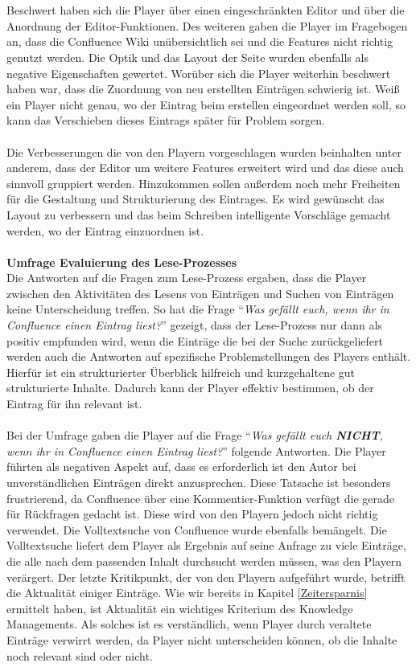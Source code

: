 \documentclass[a4paper,12pt,twoside]{scrartcl}
\begin{document}
\\\\
Beschwert haben sich die Player über einen eingeschränkten Editor und über die Anordnung der Editor-Funktionen. Des weiteren gaben die Player im Fragebogen an, dass die Confluence Wiki unübersichtlich sei und die Features nicht richtig genutzt werden. Die Optik und das Layout der Seite wurden ebenfalls als negative Eigenschaften gewertet. Worüber sich die Player weiterhin beschwert haben war, dass die Zuordnung von neu erstellten Einträgen schwierig ist. Weiß ein Player nicht genau, wo der Eintrag beim erstellen eingeordnet werden soll, so kann das Verschieben dieses Eintrags später für Problem sorgen.
\\\\
Die Verbesserungen die von den Playern vorgeschlagen wurden beinhalten unter anderem, dass der Editor um weitere Features erweitert wird und das diese auch sinnvoll gruppiert werden. Hinzukommen sollen außerdem noch mehr Freiheiten für die Gestaltung und Strukturierung des Eintrages. Es wird gewünscht das Layout zu verbessern und das beim Schreiben intelligente Vorschläge gemacht werden, wo der Eintrag einzuordnen ist.
\\\\
\textbf{Umfrage Evaluierung des Lese-Prozesses}\\
Die Antworten auf die Fragen zum Lese-Prozess ergaben, dass die Player zwischen den Aktivitäten des Lesens von Einträgen und Suchen von Einträgen keine Unterscheidung treffen. So hat die Frage \enquote{\textit{Was gefällt euch, wenn ihr in Confluence einen Eintrag liest?}} gezeigt, dass der Lese-Prozess nur dann als positiv empfunden wird, wenn die Einträge die bei der Suche zurückgeliefert werden auch die Antworten auf spezifische Problemstellungen des Players enthält. Hierfür ist ein strukturierter Überblick hilfreich und kurzgehaltene gut strukturierte Inhalte. Dadurch kann der Player effektiv bestimmen, ob der Eintrag für ihn relevant ist. 
\\\\
Bei der Umfrage gaben die Player auf die Frage \enquote{\textit{Was gefällt euch \textbf{NICHT}, wenn ihr in Confluence einen Eintrag liest?}} folgende Antworten. Die Player führten als negativen Aspekt auf, dass es erforderlich ist den Autor bei unverständlichen Einträgen direkt anzusprechen. Diese Tatsache ist besonders frustrierend, da Confluence über eine Kommentier-Funktion verfügt die gerade für Rückfragen gedacht ist. Diese wird von den Playern jedoch nicht richtig verwendet. Die Volltextsuche von Confluence wurde ebenfalls bemängelt. Die Volltextsuche liefert dem Player als Ergebnis auf seine Anfrage zu viele Einträge, die alle nach dem passenden Inhalt durchsucht werden müssen, was den Playern verärgert. Der letzte Kritikpunkt, der von den Playern aufgeführt wurde, betrifft die Aktualität einiger Einträge. Wie wir bereits in Kapitel \ref{Zeitersparnis} ermittelt haben, ist Aktualität ein wichtiges Kriterium des Knowledge Managements. Als solches ist es verständlich, wenn Player durch veraltete Einträge verwirrt werden, da Player nicht unterscheiden können, ob die Inhalte noch relevant sind oder nicht. 
\end{document}
